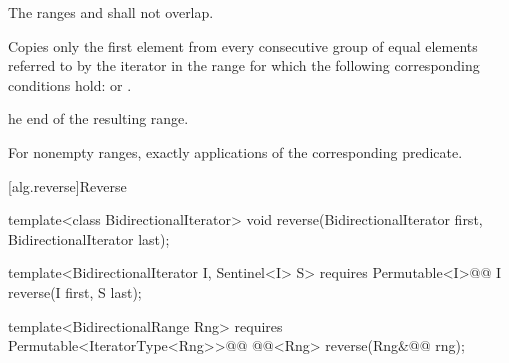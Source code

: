 \begin{itemdescr}
\pnum
\requires
{}
The ranges
and
shall not overlap. 

\pnum
\effects
Copies only the first element from every consecutive group of equal elements referred to by
the iterator
in the range
for which the following corresponding conditions hold:
or
.

\pnum
\returns
{}he end of the resulting range.

\pnum
\complexity
For nonempty ranges, exactly
applications of the corresponding predicate.
\end{itemdescr}

[alg.reverse]{Reverse}

%
\begin{removedblock}
\begin{itemdecl}
template<class BidirectionalIterator>
  void reverse(BidirectionalIterator first, BidirectionalIterator last);
\end{itemdecl}
\end{removedblock}
\begin{addedblock}
\begin{itemdecl}
template<BidirectionalIterator I, Sentinel<I> S>
  requires Permutable<I>@\newtxt{()}@
  I reverse(I first, S last);

template<BidirectionalRange Rng>
  requires Permutable<IteratorType<Rng>>@\newtxt{()}@
  @@<Rng>
    reverse(Rng&@\newtxt{\&}@ rng);
\end{itemdecl}
\end{addedblock}

